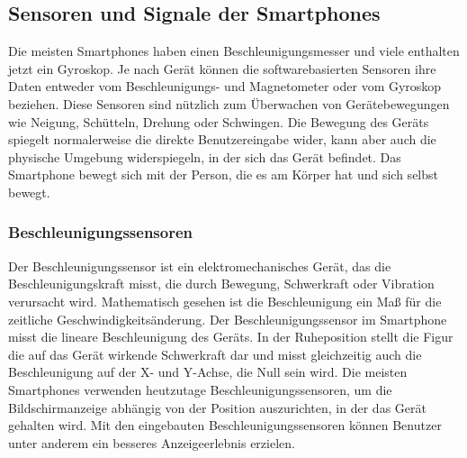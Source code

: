 \subsection{Sensoren und Signale der Smartphones}

%
%
%
%
%
Die meisten Smartphones haben einen Beschleunigungsmesser und viele enthalten jetzt ein Gyroskop. Je nach Gerät können die softwarebasierten Sensoren ihre Daten entweder vom Beschleunigungs- und Magnetometer oder vom Gyroskop beziehen. Diese Sensoren sind nützlich zum Überwachen von Gerätebewegungen wie Neigung, Schütteln, Drehung oder Schwingen. Die Bewegung des Geräts spiegelt normalerweise die direkte Benutzereingabe wider, kann aber auch die physische Umgebung widerspiegeln, in der sich das Gerät befindet. Das Smartphone bewegt sich mit der Person, die es am Körper hat und sich selbst bewegt.\citep{DevelopersMotionSen}



%
%
%
%


\subsubsection{Beschleunigungssensoren}

Der Beschleunigungssensor ist ein elektromechanisches Gerät, das die Beschleunigungskraft misst, die durch Bewegung, Schwerkraft oder Vibration verursacht wird. Mathematisch gesehen ist die Beschleunigung ein Maß für die zeitliche Geschwindigkeitsänderung.
Der Beschleunigungssensor im Smartphone misst die lineare Beschleunigung des Geräts. In der Ruheposition stellt die Figur die auf das Gerät wirkende Schwerkraft dar und misst gleichzeitig auch die Beschleunigung auf der X- und Y-Achse, die Null sein wird.
Die meisten Smartphones verwenden heutzutage Beschleunigungssensoren, um die Bildschirmanzeige abhängig von der Position auszurichten, in der das Gerät gehalten wird. Mit den eingebauten Beschleunigungssensoren können Benutzer unter anderem ein besseres Anzeigeerlebnis erzielen. \citep{Sharma2020}

